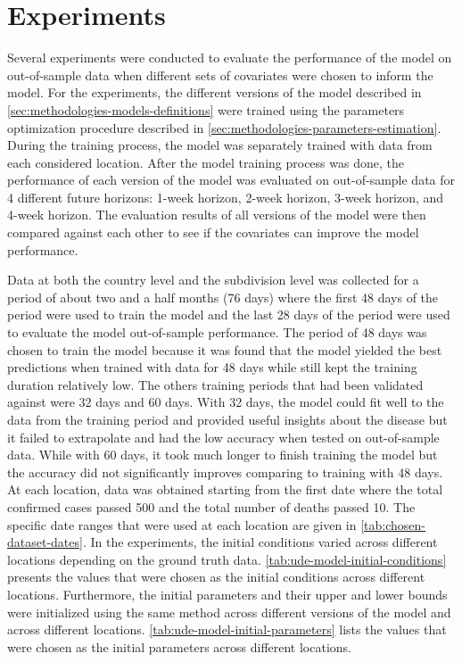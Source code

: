\section{Experiments}
\label{sec:methodologies-experiments}

Several experiments were conducted to evaluate the performance of the model on out-of-sample data when different sets of covariates were chosen to inform the model.
For the experiments, the different versions of the model described in \autoref{sec:methodologies-models-definitions} were trained using the parameters optimization procedure described in \autoref{sec:methodologies-parameters-estimation}.
During the training process, the model was separately trained with data from each considered location.
After the model training process was done, the performance of each version of the model was evaluated on out-of-sample data for 4 different future horizons: 1-week horizon, 2-week horizon, 3-week horizon, and 4-week horizon.
The evaluation results of all versions of the model were then compared against each other to see if the covariates can improve the model performance.

Data at both the country level and the subdivision level was collected for a period of about two and a half months (76 days) where the first 48 days of the period were used to train the model and the last 28 days of the period were used to evaluate the model out-of-sample performance.
The period of 48 days was chosen to train the model because it was found that the model yielded the best predictions when trained with data for 48 days while still kept the training duration relatively low.
The others training periods that had been validated against were 32 days and 60 days.
With 32 days, the model could fit well to the data from the training period and provided useful insights about the disease but it failed to extrapolate and had the low accuracy when tested on out-of-sample data.
While with 60 days, it took much longer to finish training the model but the accuracy did not significantly improves comparing to training with 48 days.
At each location, data was obtained starting from the first date where the total confirmed cases passed 500 and the total number of deaths passed 10.
The specific date ranges that were used at each location are given in \autoref{tab:chosen-dataset-dates}.
In the experiments, the initial conditions varied across different locations depending on the ground truth data.
\autoref{tab:ude-model-initial-conditions} presents the values that were chosen as the initial conditions across different locations.
Furthermore, the initial parameters and their upper and lower bounds were initialized using the same method across different versions of the model and across different locations.
\autoref{tab:ude-model-initial-parameters} lists the values that were chosen as the initial parameters across different locations.

